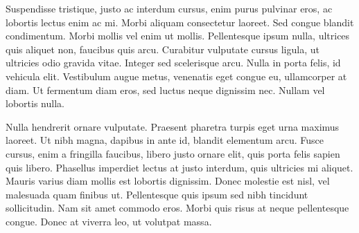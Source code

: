 Suspendisse tristique, justo ac interdum cursus, enim purus pulvinar eros, ac lobortis lectus enim ac mi. Morbi aliquam consectetur laoreet. Sed congue blandit condimentum. Morbi mollis vel enim ut mollis. Pellentesque ipsum nulla, ultrices quis aliquet non, faucibus quis arcu. Curabitur vulputate cursus ligula, ut ultricies odio gravida vitae. Integer sed scelerisque arcu. Nulla in porta felis, id vehicula elit. Vestibulum augue metus, venenatis eget congue eu, ullamcorper at diam. Ut fermentum diam eros, sed luctus neque dignissim nec. Nullam vel lobortis nulla.

Nulla hendrerit ornare vulputate. Praesent pharetra turpis eget urna maximus laoreet. Ut nibh magna, dapibus in ante id, blandit elementum arcu. Fusce cursus, enim a fringilla faucibus, libero justo ornare elit, quis porta felis sapien quis libero. Phasellus imperdiet lectus at justo interdum, quis ultricies mi aliquet. Mauris varius diam mollis est lobortis dignissim. Donec molestie est nisl, vel malesuada quam finibus ut. Pellentesque quis ipsum sed nibh tincidunt sollicitudin. Nam sit amet commodo eros. Morbi quis risus at neque pellentesque congue. Donec at viverra leo, ut volutpat massa. 


